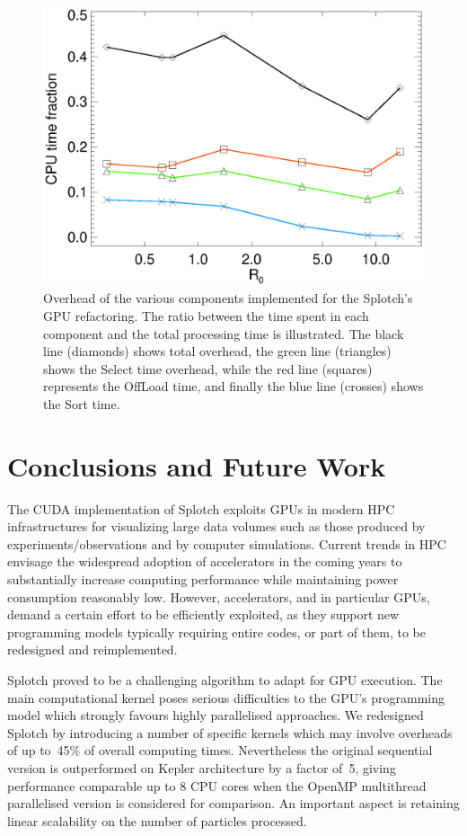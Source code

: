 \documentclass[preprint,5pt]{elsarticle}
\begin{document}
\begin{figure}
\includegraphics[scale=0.5]{overheadsK20-fig9.eps}
\caption{Overhead of the various components implemented for the Splotch's
GPU refactoring. The ratio between the time spent in each component and the total processing 
time is illustrated. The black line (diamonds) shows total overhead, the green line (triangles) shows the Select time overhead, while the red line (squares) represents the OffLoad time, and finally the blue line (crosses) shows the Sort time.}
\label{fig:over}
\end{figure}

\section{Conclusions and Future Work}
\label{sec:conclusions}
The CUDA implementation of Splotch exploits GPUs in modern HPC infrastructures for visualizing large data volumes such as those produced by experiments/observations and by computer simulations. Current trends in HPC envisage the widespread adoption of accelerators in the coming years to substantially increase computing performance while maintaining power consumption reasonably low. However, accelerators, and in particular GPUs, demand a certain effort to be efficiently exploited, as they support new programming models typically requiring entire codes, or part of them, to be redesigned and reimplemented.

Splotch proved to be a challenging algorithm to adapt for GPU execution. The main computational kernel poses serious difficulties to the GPU's programming model which strongly favours highly parallelised approaches. We redesigned Splotch by introducing a number of specific kernels which may involve overheads of up to~45\% of overall computing times. Nevertheless the original sequential 
version is outperformed on Kepler architecture by a factor of~5, giving performance comparable up to 8 CPU cores when the OpenMP multithread parallelised version is considered for comparison. An important aspect is retaining linear scalability on the number of particles processed.
\end{document}

